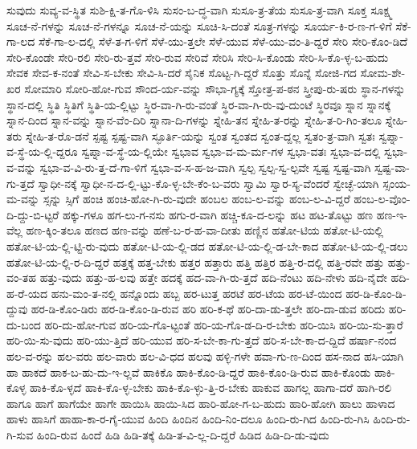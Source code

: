 {ಸುವುದು
ಸುವ್ಯ-ವ-ಸ್ಥಿತ
ಸುಶಿ-ಕ್ಷಿ-ತ-ಗೊ-ಳಿಸಿ
ಸುಸಂ-ಬ-ದ್ಧ-ವಾಗಿ
ಸುಸೂ-ತ್ರ-ತೆಯ
ಸುಸೂ-ತ್ರ-ವಾಗಿ
ಸೂಕ್ತ
ಸೂಕ್ಷ್ಮ
ಸೂಚ-ನೆ-ಗಳನ್ನು
ಸೂಚ-ನೆ-ಗಳನ್ನೂ
ಸೂಚ-ನೆ-ಯನ್ನು
ಸೂಚಿ-ಸಿ-ದಂತೆ
ಸೂತ್ರ-ಗಳನ್ನು
ಸೂರ್ಯ-ಕಿ-ರ-ಣ-ಗ-ಳಿಗೆ
ಸೆಕೆ-ಗಾ-ಲದ
ಸೆಕೆ-ಗಾ-ಲ-ದಲ್ಲಿ
ಸೆಳೆ-ತ-ಗ-ಳಿಗೆ
ಸೆಳೆ-ಯು-ತ್ತಲೇ
ಸೆಳೆ-ಯುವ
ಸೆಳೆ-ಯು-ವಂ-ತಿ-ದ್ದರೆ
ಸೇರಿ
ಸೇರಿ-ಕೊಂ-ಡಿದೆ
ಸೇರಿ-ಕೊಂಡೇ
ಸೇರಿ-ರಲಿ
ಸೇರಿ-ರು-ತ್ತವೆ
ಸೇರಿ-ರುವ
ಸೇರಿವೆ
ಸೇರಿಸಿ
ಸೇರಿ-ಸಿ-ಕೊಂಡು
ಸೇರಿ-ಸಿ-ಕೊ-ಳ್ಳ-ಬ-ಹುದು
ಸೇವಕ
ಸೇವ-ಕ-ನಂತೆ
ಸೇವಿ-ಸ-ಬೇಕು
ಸೇವಿ-ಸಿ-ದರೆ
ಸೈನಿಕ
ಸೊಟ್ಟ-ಗಿ-ದ್ದರೆ
ಸೊತ್ತು
ಸೊನ್ನೆ
ಸೋಜಿ-ಗದ
ಸೋಮ-ಶೇ-ಖರ
ಸೋಮಾರಿ
ಸೋರಿ-ಹೋ-ಗುವ
ಸೌಂದ-ರ್ಯ-ವನ್ನು
ಸೌಭಾ-ಗ್ಯಕ್ಕೆ
ಸ್ತೋತ್ರ-ಪ-ಠನ
ಸ್ತ್ರೀಪು-ರು-ಷರು
ಸ್ಥಾನ-ಗಳನ್ನು
ಸ್ಥಾನ-ದಲ್ಲಿ
ಸ್ಥಿತಿ
ಸ್ಥಿತಿಗೆ
ಸ್ಥಿತಿ-ಯ-ಲ್ಲಿಟ್ಟು
ಸ್ಥಿರ-ವಾ-ಗಿ-ರು-ವಂತೆ
ಸ್ಥಿರ-ವಾ-ಗಿ-ರು-ವು-ದುಂಟೆ
ಸ್ಥಿರವೂ
ಸ್ನಾನ
ಸ್ನಾನಕ್ಕೆ
ಸ್ನಾನ-ದಿಂದ
ಸ್ನಾನ-ವನ್ನು
ಸ್ನಾನ-ವೆಂ-ದಿರಿ
ಸ್ನಾನಾ-ದಿ-ಗಳನ್ನು
ಸ್ನೇಹಿ-ತನ
ಸ್ನೇಹಿ-ತ-ರನ್ನು
ಸ್ನೇಹಿ-ತ-ರಿ-ಗಿಂ-ತಲೂ
ಸ್ನೇಹಿ-ತರು
ಸ್ನೇಹಿ-ತ-ರೊ-ಡನೆ
ಸ್ಪಷ್ಟ
ಸ್ಪಷ್ಟ-ವಾಗಿ
ಸ್ಫೂರ್ತಿ-ಯನ್ನು
ಸ್ವಂತ
ಸ್ವಂತದ
ಸ್ವಂತ-ದ್ದಲ್ಲ
ಸ್ವತಂ-ತ್ರ-ವಾಗಿ
ಸ್ವತಃ
ಸ್ವಪ್ನಾ-ವ-ಸ್ಥೆ-ಯ-ಲ್ಲಿ-ದ್ದರೂ
ಸ್ವಪ್ನಾ-ವ-ಸ್ಥೆ-ಯ-ಲ್ಲಿಯೇ
ಸ್ವಭಾವ
ಸ್ವಭಾ-ವ-ಮ-ರ್ಮ-ಗಳ
ಸ್ವಭಾ-ವತಃ
ಸ್ವಭಾ-ವ-ದಲ್ಲಿ
ಸ್ವಭಾ-ವ-ವನ್ನು
ಸ್ವಭಾ-ವ-ವಿ-ರು-ತ್ತ-ದೆ-ಗಾ-ಳಿಗೆ
ಸ್ವಭಾ-ವ-ಸ-ಹ-ಜ-ವಾಗಿ
ಸ್ವಲ್ಪ
ಸ್ವಲ್ಪ-ಸ್ವ-ಲ್ಪವೇ
ಸ್ವಷ್ಟ
ಸ್ವಷ್ಟ-ವಾಗಿ
ಸ್ವಷ್ಟ-ವಾ-ಗು-ತ್ತದೆ
ಸ್ವಾಧೀ-ನಕ್ಕೆ
ಸ್ವಾಧೀ-ನ-ದ-ಲ್ಲಿ-ಟ್ಟು-ಕೊ-ಳ್ಳ-ಬೇ-ಕೆಂ-ಬ-ವರು
ಸ್ವಾಮಿ
ಸ್ವಾರ-ಸ್ಯ-ವೆಂದರೆ
ಸ್ವೇಚ್ಛೆ-ಯಾಗಿ
ಸ್ಸಂಯ-ಮ-ವನ್ನು
ಸ್ಸನ್ನು
ಸ್ಸಿಗೆ
ಹಂಚಿ
ಹಂಚಿ-ಹೋ-ಗಿ-ರು-ವುದೇ
ಹಂಬಲ
ಹಂಬ-ಲ-ವನ್ನು
ಹಂಬ-ಲ-ವಿ-ದ್ದರೆ
ಹಂಬ-ಲ-ವೊಂ-ದಿ-ದ್ದು-ಬಿ-ಟ್ಟರೆ
ಹಕ್ಕು-ಗಳೂ
ಹಗ-ಲು-ಗ-ನಸು
ಹಗು-ರ-ವಾಗಿ
ಹಚ್ಚಿ-ಕೂ-ದ-ಲನ್ನು
ಹಟ
ಹಟ-ತೊಟ್ಟು
ಹಣ
ಹಣ-ಇ-ವೆಲ್ಲ
ಹಣ-ಕ್ಕಿಂ-ತಲೂ
ಹಣದ
ಹಣ-ವನ್ನು
ಹಣೆ-ಬ-ರ-ಹ-ವಾ-ದೀತು
ಹಣ್ಣಿನ
ಹತೋ-ಟಿಯ
ಹತೋ-ಟಿ-ಯಲ್ಲಿ
ಹತೋ-ಟಿ-ಯ-ಲ್ಲಿ-ಟ್ಟಿ-ರು-ವುದು
ಹತೋ-ಟಿ-ಯ-ಲ್ಲಿ-ಡದ
ಹತೋ-ಟಿ-ಯ-ಲ್ಲಿ-ಡ-ಬೇ-ಕಾದ
ಹತೋ-ಟಿ-ಯ-ಲ್ಲಿ-ಡಲು
ಹತೋ-ಟಿ-ಯ-ಲ್ಲಿ-ರ-ದಿ-ದ್ದರೆ
ಹತ್ತಕ್ಕೆ
ಹತ್ತ-ಬೇಕು
ಹತ್ತರ
ಹತ್ತಾರು
ಹತ್ತಿ
ಹತ್ತಿರ
ಹತ್ತಿ-ರ-ದಲ್ಲಿ
ಹತ್ತಿ-ರವೇ
ಹತ್ತು
ಹತ್ತು-ವಂ-ತಹ
ಹತ್ತು-ವುದು
ಹತ್ತು-ಹ-ಲವು
ಹತ್ತೇ
ಹದಕ್ಕೆ
ಹದ-ವಾ-ಗಿ-ರು-ತ್ತದೆ
ಹದಿ-ನೆಂಟು
ಹದಿ-ನೇಳು
ಹದಿ-ನೈದೇ
ಹದಿ-ಹ-ರೆ-ಯದ
ಹನು-ಮಂ-ತ-ನಲ್ಲಿ
ಹನ್ನೊಂದು
ಹಬ್ಬ
ಹರ-ಟುತ್ತ
ಹರಟೆ
ಹರ-ಟೆಯ
ಹರ-ಟೆ-ಯಿಂದ
ಹರ-ಡಿ-ಕೊಂ-ಡಿ-ದ್ದುವು
ಹರ-ಡಿ-ಕೊಂ-ಡಿರು
ಹರ-ಡಿ-ಕೊಂ-ಡಿ-ರುವ
ಹರಿ
ಹರಿ-ಕ-ಥೆ
ಹರಿ-ದಾ-ಡು-ತ್ತಲೇ
ಹರಿ-ದಾ-ಡುವ
ಹರಿದು
ಹರಿ-ದು-ಬಂದ
ಹರಿ-ದು-ಹೋ-ಗುವ
ಹರಿ-ಯ-ಗೊ-ಟ್ಟಂತೆ
ಹರಿ-ಯ-ಗೊ-ಡ-ದಿ-ರ-ಬೇಕು
ಹರಿ-ಯಿಸಿ
ಹರಿ-ಯಿ-ಸು-ತ್ತಾರೆ
ಹರಿ-ಯಿ-ಸು-ವುದು
ಹರಿ-ಯು-ತ್ತಿದೆ
ಹರಿ-ಯುವ
ಹರಿ-ಸ-ಬೇ-ಕಾ-ಗು-ತ್ತದೆ
ಹರಿ-ಸ-ಬೇ-ಕಾ-ದ-ದ್ದಿದೆ
ಹರ್ಷಾ-ನಂದ
ಹಲ-ವ-ರನ್ನು
ಹಲ-ವರು
ಹಲ-ವಾರು
ಹಲ-ವಿ-ಧದ
ಹಲವು
ಹಳ್ಳಿ-ಗಳೇ
ಹವಾ-ಗು-ಣ-ದಿಂದ
ಹಸ-ನಾದ
ಹಸಿ-ಯಾಗಿ
ಹಾ
ಹಾಕದೆ
ಹಾಕ-ಬ-ಹು-ದು-ಇ-ಲ್ಲವೆ
ಹಾಕಿಕೊ
ಹಾಕಿ-ಕೊಂ-ಡಿ-ದ್ದರೆ
ಹಾಕಿ-ಕೊಂ-ಡಿ-ರುವ
ಹಾಕಿ-ಕೊಂಡು
ಹಾಕಿ-ಕೊಳ್ಳ
ಹಾಕಿ-ಕೊ-ಳ್ಳದೆ
ಹಾಕಿ-ಕೊ-ಳ್ಳ-ಬೇಕು
ಹಾಕಿ-ಕೊ-ಳ್ಳು-ತ್ತಿ-ರ-ಬೇಕು
ಹಾಕುವ
ಹಾಗಲ್ಲ
ಹಾಗಾ-ದರೆ
ಹಾಗಿ-ರಲಿ
ಹಾಗೂ
ಹಾಗೆ
ಹಾಗೆಯೇ
ಹಾಗೇ
ಹಾಯಿಸಿ
ಹಾಯಿ-ಸಿದ
ಹಾರಿ-ಹೋ-ಗ-ಬ-ಹುದು
ಹಾರಿ-ಹೋಗಿ
ಹಾಲು
ಹಾಳಾದ
ಹಾಳು
ಹಾಸಿಗೆ
ಹಾಹಾ-ಕಾ-ರ-ಗೈ-ಯುವ
ಹಿಂದಿ
ಹಿಂದಿನ
ಹಿಂದಿ-ನಿಂ-ದಲೂ
ಹಿಂದಿ-ರು-ಗಿದ
ಹಿಂದಿ-ರು-ಗಿಸಿ
ಹಿಂದಿ-ರು-ಗಿ-ಸುವ
ಹಿಂದಿ-ರುವ
ಹಿಂದೆ
ಹಿಡಿ
ಹಿಡಿ-ತಕ್ಕೆ
ಹಿಡಿ-ತ-ವಿ-ಲ್ಲ-ದಿ-ದ್ದರೆ
ಹಿಡಿದ
ಹಿಡಿ-ದಿ-ಡು-ವುದು
}
